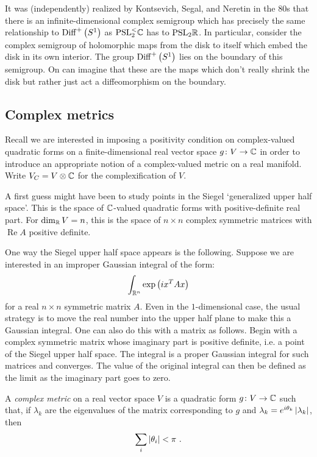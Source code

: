 It was (independently) realized by Kontsevich, Segal, and Neretin in the 80s
\cite{Ner,S:CFT} that there is an infinite-dimensional complex semigroup which has
precisely the same relationship to $\operatorname{Diff}^+\left(S^1\right)$ as 
$\mathrm{PSL}_2^{<}\mathbb{C}$ has to $\mathrm{PSL}_2 \mathbb{R}$.
In particular, consider the complex semigroup of holomorphic maps from the disk to itself
which embed the disk in its own interior.
The group $\operatorname{Diff}^+\left(S^1\right)$ lies on the boundary of this semigroup.
On can imagine that these are the maps which don't really shrink the disk but rather just
act a diffeomorphism on the boundary. 

\subsection{Complex metrics}
\label{sec:C_met}

Recall we are interested in imposing a positivity condition on
complex-valued quadratic forms on a finite-dimensional real vector space 
$g \colon V \to \mathbb{C}$ in order to introduce an appropriate notion of a complex-valued
metric on a real manifold. 
Write $V_C = V\otimes \mathbb{C}$ for the complexification of $V$.

A first guess might have been to study points in the Siegel `generalized upper half
space'. This is the space of $\mathbb{C}$-valued quadratic forms with positive-definite real
part. For $\dim_{\mathbb{R}} V = n$, this is the space of $n\times n$ complex symmetric
matrices with $\mathop{Re} A$ positive definite.

One way the Siegel upper half space appears is the following.
Suppose we are interested in an improper Gaussian integral of the form:
\begin{equation*}
\int_{\mathbb{R}^n} \exp\left(
i x^T A x 
\right)
\end{equation*}
for a real $n\times n$ symmetric matrix $A$.
Even in the $1$-dimensional case, the usual strategy is to move the real number into the
upper half plane to make this a Gaussian integral.
One can also do this with a matrix as follows. Begin with a complex symmetric matrix whose imaginary
part is positive definite, i.e. a point of the Siegel upper half space. 
The integral is a proper Gaussian integral for such matrices and converges.
The value of the original integral can then be defined as the limit as the imaginary part
goes to zero. 

\begin{dfn}
A \emph{complex metric} on a real vector space $V$ is a quadratic form
$g \colon V \to \mathbb{C}$ such that, if $\lambda_k$ are the eigenvalues of the 
matrix corresponding to $g$ and 
$\lambda_k = e^{i \theta_k} \left|{\lambda_k}\right|$, then
\begin{equation}
\sum_i \left|{\theta_i}\right| < \pi \ .
\label{eqn:C_metric}
\end{equation}
\label{dfn:C_metric}
\end{dfn}

